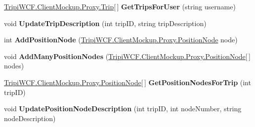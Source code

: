 \begin{DoxyCompactItemize}
\item 
\hypertarget{interface_tripi_w_c_f_1_1_client_mockup_1_1_proxy_1_1_i_trip_service_a73334ca5ba2410491360b8c8f32d720f}{
\hyperlink{class_tripi_w_c_f_1_1_client_mockup_1_1_proxy_1_1_trip}{TripiWCF.ClientMockup.Proxy.Trip}\mbox{[}$\,$\mbox{]} {\bfseries GetTripsForUser} (string username)}
\label{interface_tripi_w_c_f_1_1_client_mockup_1_1_proxy_1_1_i_trip_service_a73334ca5ba2410491360b8c8f32d720f}

\item 
\hypertarget{interface_tripi_w_c_f_1_1_client_mockup_1_1_proxy_1_1_i_trip_service_a71592985f09be23741615f2e81b2cc7c}{
void {\bfseries UpdateTripDescription} (int tripID, string tripDescription)}
\label{interface_tripi_w_c_f_1_1_client_mockup_1_1_proxy_1_1_i_trip_service_a71592985f09be23741615f2e81b2cc7c}

\item 
\hypertarget{interface_tripi_w_c_f_1_1_client_mockup_1_1_proxy_1_1_i_trip_service_a7a16e71dc67db34b9436119c7203b407}{
int {\bfseries AddPositionNode} (\hyperlink{class_tripi_w_c_f_1_1_client_mockup_1_1_proxy_1_1_position_node}{TripiWCF.ClientMockup.Proxy.PositionNode} node)}
\label{interface_tripi_w_c_f_1_1_client_mockup_1_1_proxy_1_1_i_trip_service_a7a16e71dc67db34b9436119c7203b407}

\item 
\hypertarget{interface_tripi_w_c_f_1_1_client_mockup_1_1_proxy_1_1_i_trip_service_ae49d01ed708a902da84ea3f2709dd171}{
void {\bfseries AddManyPositionNodes} (\hyperlink{class_tripi_w_c_f_1_1_client_mockup_1_1_proxy_1_1_position_node}{TripiWCF.ClientMockup.Proxy.PositionNode}\mbox{[}$\,$\mbox{]} nodes)}
\label{interface_tripi_w_c_f_1_1_client_mockup_1_1_proxy_1_1_i_trip_service_ae49d01ed708a902da84ea3f2709dd171}

\item 
\hypertarget{interface_tripi_w_c_f_1_1_client_mockup_1_1_proxy_1_1_i_trip_service_a94f0b89ebce82a430cac8e5867fe8406}{
\hyperlink{class_tripi_w_c_f_1_1_client_mockup_1_1_proxy_1_1_position_node}{TripiWCF.ClientMockup.Proxy.PositionNode}\mbox{[}$\,$\mbox{]} {\bfseries GetPositionNodesForTrip} (int tripID)}
\label{interface_tripi_w_c_f_1_1_client_mockup_1_1_proxy_1_1_i_trip_service_a94f0b89ebce82a430cac8e5867fe8406}

\item 
\hypertarget{interface_tripi_w_c_f_1_1_client_mockup_1_1_proxy_1_1_i_trip_service_ad7182a47d94448db54ba552032d9c0d7}{
void {\bfseries UpdatePositionNodeDescription} (int tripID, int nodeNumber, string nodeDescription)}
\label{interface_tripi_w_c_f_1_1_client_mockup_1_1_proxy_1_1_i_trip_service_ad7182a47d94448db54ba552032d9c0d7}

\end{DoxyCompactItemize}


